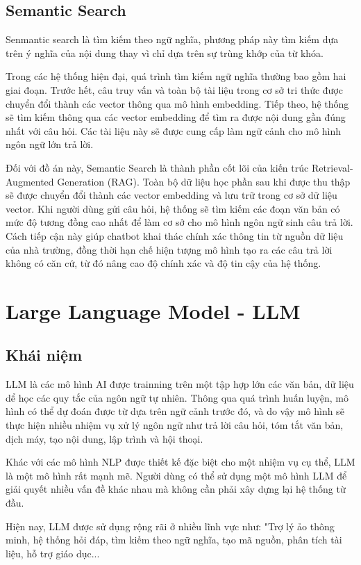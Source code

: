 \documentclass[../DoAn.tex]{subfiles}
\begin{document}
\subsection{Semantic Search}
Senmantic search là tìm kiếm theo ngữ nghĩa, phương pháp này tìm kiếm dựa trên ý nghĩa của nội dung thay vì chỉ dựa trên sự trùng khớp của từ khóa.

Trong các hệ thống hiện đại, quá trình tìm kiếm ngữ nghĩa thường bao gồm hai giai đoạn. Trước hết, câu truy vấn và toàn bộ tài liệu trong cơ sở tri thức được chuyển đổi thành các vector thông qua mô hình embedding. Tiếp theo, hệ thống sẽ tìm kiếm thông qua các vector embedding để tìm ra được nội dung gần đúng nhất với câu hỏi. Các tài liệu này sẽ được cung cấp làm ngữ cảnh cho mô hình ngôn ngữ lớn trả lời.

Đối với đồ án này, Semantic Search là thành phần cốt lõi của kiến trúc Retrieval-Augmented Generation (RAG). Toàn bộ dữ liệu học phần sau khi được thu thập sẽ được chuyển đổi thành các vector embedding và lưu trữ trong cơ sở dữ liệu vector. Khi người dùng gửi câu hỏi, hệ thống sẽ tìm kiếm các đoạn văn bản có mức độ tương đồng cao nhất để làm cơ sở cho mô hình ngôn ngữ sinh câu trả lời. Cách tiếp cận này giúp chatbot khai thác chính xác thông tin từ nguồn dữ liệu của nhà trường, đồng thời hạn chế hiện tượng mô hình tạo ra các câu trả lời không có căn cứ, từ đó nâng cao độ chính xác và độ tin cậy của hệ thống.

\section{Large Language Model - LLM}
\subsection{Khái niệm}
LLM là các mô hình AI được trainning trên một tập hợp lớn các văn bản, dữ liệu dể học các quy tắc của ngôn ngữ tự nhiên. Thông qua quá trình huấn luyện, mô hình có thể dự đoán được từ dựa trên ngữ cảnh trước đó, và do vậy mô hình sẽ thực hiện nhiều nhiệm vụ xử lý ngôn ngữ như trả lời câu hỏi, tóm tắt văn bản, dịch máy, tạo nội dung, lập trình và hội thoại.

Khác với các mô hình NLP được thiết kế đặc biệt cho một nhiệm vụ cụ thể, LLM là một mô hình rất mạnh mẽ. Người dùng có thể sử dụng một mô hình LLM để giải quyết nhiều vấn đề khác nhau mà không cần phải xây dựng lại hệ thống từ đầu.

Hiện nay, LLM được sử dụng rộng rãi ở nhiều lĩnh vực như: "Trợ lý ảo thông minh, hệ thống hỏi đáp, tìm kiếm theo ngữ nghĩa, tạo mã nguồn, phân tích tài liệu, hỗ trợ giáo dục...
\end{document}
